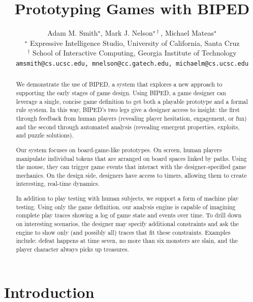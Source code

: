 \documentclass[letterpaper]{article}
\title{Prototyping Games with BIPED}
\author{Adam M. Smith$^\star$, Mark J. Nelson$^{\star\dagger}$, Michael Mateas$^\star$\\
$^\star$ Expressive Intelligence Studio, University of California, Santa Cruz\\
$^\dagger$ School of Interactive Computing, Georgia Institute of Technology\\
\texttt{amsmith@cs.ucsc.edu, mnelson@cc.gatech.edu, michaelm@cs.ucsc.edu}
}
\begin{document}
\maketitle

\begin{abstract}

We demonstrate the use of BIPED, a system that explores a new approach to
supporting the early stages of game design. Using BIPED, a game designer can
leverage a single, concise game definition to get both a playable prototype and
a formal rule system. In this way, BIPED's two legs give a designer access to
insight: the first through feedback from human players (revealing player
hesitation, engagement, or fun) and the second through automated analysis
(revealing emergent properties, exploits, and puzzle solutions).

Our system focuses on board-game-like prototypes. On screen, human players
manipulate individual tokens that are arranged on board spaces linked by paths.
Using the mouse, they can trigger game events that interact with the
designer-specified game mechanics. On the design side, designers have access to
timers, allowing them to create interesting, real-time dynamics.

In addition to play testing with human subjects, we support a form of machine
play testing. Using only the game definition, our analysis engine is capable
of imagining complete play traces showing a log of game state and events over
time. To drill down on interesting scenarios, the designer may specify
additional constraints and ask the engine to show only (and possibly all)
traces that fit these constraints. Examples include: defeat happens at time
seven, no more than six monsters are slain, and the player character always
picks up treasures.

\end{abstract}

\section{Introduction}
\end{document}
